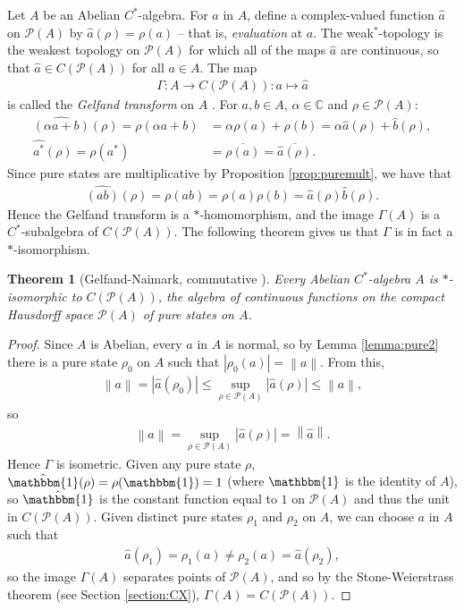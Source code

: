\documentclass[11pt,a4paper]{report}
\theoremstyle{plain}
\newtheorem{thm}{Theorem}
\theoremstyle{definition}
\newcommand{\1}{\mathbbm{1}}
\newcommand{\C}{\mathbb{C}}
\renewcommand{\P}[1]{\mathscr{P}(#1)}
\begin{document}
Let $A$ be an Abelian $C^\ast$-algebra. For $a$ in $A$, define a complex-valued 
function $\hat{a}$ on $\P{A}$ by $\hat{a}(\rho)= \rho(a)$ -- that is, 
\emph{evaluation} at $a$. The weak$^\ast$-topology is the weakest topology on 
$\P{A}$ for which all of the maps $\hat{a}$ are continuous, so that $\hat{a} \in 
C(\P{A})$ for all $a\in A$. The map
\begin{align*}
	\Gamma:A \to C(\P{A}) : a\mapsto \hat{a}
\end{align*}
is called the \emph{Gelfand transform} on $A$ \cite{davidson96}.
For $a,b \in A$, $\alpha\in\C$ and $\rho\in\P{A}$:
\begin{align*}
		\widehat{(\alpha a+ b)}(\rho) = \rho(\alpha a+ b) 
	&=	\alpha\rho(a) +\rho(b) = \alpha\hat{a}(\rho)+\hat{b}(\rho), 					\\
		\widehat{a^\ast}(\rho) = \rho(a^\ast) 
	&= \overline{\rho(a)} = \overline{\hat{a}(\rho)}.
\end{align*}
Since pure states are multiplicative by Proposition \ref{prop:puremult}, we have that 
\begin{align*}
	\widehat{(ab)} (\rho)= \rho(ab) = \rho(a)\rho(b) = \hat{a}(\rho)\hat{b}(\rho).
\end{align*}
Hence the Gelfand transform is a $\ast$-homomorphism, and the image $\Gamma(A)$ 
is a $C^\ast$-subalgebra of $C(\P A)$. The following theorem gives us that 
$\Gamma$ is in fact a $\ast$-isomorphism.

\begin{thm}[{Gelfand-Naimark, commutative \cite[4.4.3]{kadison83}}] \label{thm:gnc}
	Every Abelian $C^\ast$-algebra $A$ is $\ast$-isomorphic to $C(\P A)$, the 
	algebra of continuous functions on the compact Hausdorff space $\P A$ of pure 
	states on $A$.

\end{thm}
\begin{proof}
	Since $A$ is Abelian, every $a$ in $A$ is normal, so by Lemma \ref{lemma:pure2} 
	there is a pure state $\rho_0$ on $A$ such that $|\rho_0(a)|=\left\|a\right\|$. 
	From this, 
	\begin{align*}
		\left\|a\right\|	=|\hat a(\rho_0)|\leq \sup_{\rho\in\P A}|\hat a(\rho)| 
							\leq \left\|a\right\|,
	\end{align*}
	so 
	\begin{align*}
		\left\|a\right\|=\sup_{\rho\in\P A} |\hat a (\rho)| = \left\|\hat a\right\|.
	\end{align*}
	Hence $\Gamma$ is isometric.
	Given any pure state $\rho$, $\hat \1(\rho) = \rho(\1) = 1$ (where $\1$ is the 
	identity of $A$), so $\hat\1$ is the constant function equal to $1$ on $\P A$ 
	and thus the unit in $C(\P A)$. Given distinct pure states $\rho_1$ and $\rho_2$ 
	on $A$, we can choose $a$ in $A$ such that 
	\begin{align*}
		\hat a(\rho_1) = \rho_1(a) \not= \rho_2(a) = \hat a(\rho_2),
	\end{align*}
	so the image $\Gamma(A)$ separates points of $\P A$, and so by the 
	Stone-Weierstrass theorem (see Section \ref{section:CX}), $\Gamma(A)=C(\P A)$.

\end{proof}
\end{document}
